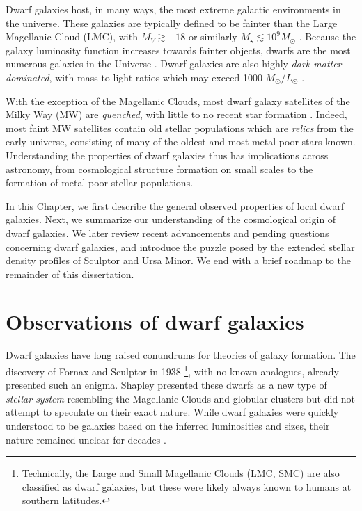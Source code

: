 Dwarf galaxies host, in many ways, the most extreme galactic
environments in the universe. These galaxies are typically defined to be
fainter than the Large Magellanic Cloud (LMC), with \(M_V \gtrsim -18\)
or similarly \(M_\star \lesssim 10^9 M_\odot\)
\citep[e.g.,][]{hodge1971, mcconnachie2012}. Because the galaxy
luminosity function increases towards fainter objects, dwarfs are the
most numerous galaxies in the Universe
\citep[e.g.,][]{blanton+2005, mao+2021}. Dwarf galaxies are also highly
\emph{dark-matter dominated}, with mass to light ratios which may exceed
1000 \(M_\odot/ L_\odot\) \citep[e.g.,][]{simon+geha2007, hayashi+2023}.

With the exception of the Magellanic Clouds, most dwarf galaxy
satellites of the Milky Way (MW) are \emph{quenched}, with little to no
recent star formation \citep[e.g.,][]{weisz+2014}. Indeed, most faint MW
satellites contain old stellar populations which are \emph{relics} from
the early universe, consisting of many of the oldest and most metal poor
stars known. Understanding the properties of dwarf galaxies thus has
implications across astronomy, from cosmological structure formation on
small scales to the formation of metal-poor stellar populations.

In this Chapter, we first describe the general observed properties of
local dwarf galaxies. Next, we summarize our understanding of the
cosmological origin of dwarf galaxies. We later review recent
advancements and pending questions concerning dwarf galaxies, and
introduce the puzzle posed by the extended stellar density profiles of
Sculptor and Ursa Minor. We end with a brief roadmap to the remainder of
this dissertation.

\section{Observations of dwarf
galaxies}\label{observations-of-dwarf-galaxies}

Dwarf galaxies have long raised conundrums for theories of galaxy
formation. The discovery of Fornax and Sculptor in 1938
\citep{shapley1938}\footnote{Technically, the Large and Small Magellanic
  Clouds (LMC, SMC) are also classified as dwarf galaxies, but these
  were likely always known to humans at southern latitudes.}, with no
known analogues, already presented such an enigma. Shapley presented
these dwarfs as a new type of \emph{stellar system} resembling the
Magellanic Clouds and globular clusters but did not attempt to speculate
on their exact nature. While dwarf galaxies were quickly understood to
be galaxies based on the inferred luminosities and sizes, their nature
remained unclear for decades
\citep[e.g.,][]{hodge1971, gallagher+wyse1994}.


